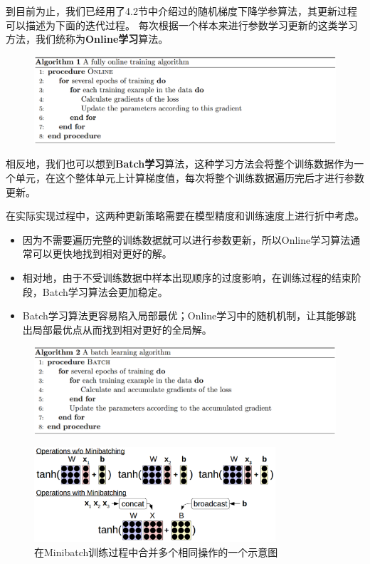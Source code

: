 \documentclass[10pt,a4paper]{ctexart}
\begin{document}
到目前为止，我们已经用了4.2节中介绍过的随机梯度下降学参算法，其更新过程可以描述为下面的迭代过程。
每次根据一个样本来进行参数学习更新的这类学习方法，我们统称为\textbf{Online学习}算法。

\begin{figure}[H]
\centering
\includegraphics[width=1\textwidth]{alg1.png}
\end{figure}

相反地，我们也可以想到\textbf{Batch学习}算法，这种学习方法会将整个训练数据作为一个单元，在这个整体单元上计算梯度值，每次将整个训练数据遍历完后才进行参数更新。

在实际实现过程中，这两种更新策略需要在模型精度和训练速度上进行折中考虑。
\begin{itemize}
\item 因为不需要遍历完整的训练数据就可以进行参数更新，所以Online学习算法通常可以更快地找到相对更好的解。
\item 相对地，由于不受训练数据中样本出现顺序的过度影响，在训练过程的结束阶段，Batch学习算法会更加稳定。
\item Batch学习算法更容易陷入局部最优；Online学习中的随机机制，让其能够跳出局部最优点从而找到相对更好的全局解。
\end{itemize}

\begin{figure}[H]
\centering
\includegraphics[width=1\textwidth]{alg2.png}
\end{figure}

\begin{figure}[H]
\centering
\includegraphics[width=0.8\textwidth]{fig19.png}
\caption{在Minibatch训练过程中合并多个相同操作的一个示意图}
\label{fig:19}
\end{figure}
\end{document}
